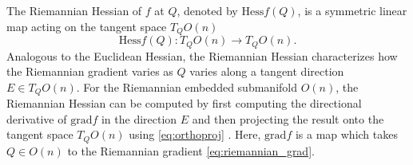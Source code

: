 \documentclass[pdflatex,sn-mathphys-num]{sn-jnl}
\begin{document}
The Riemannian Hessian of $f$ at $Q$, denoted by $\textrm{Hess}f(Q)$, is a symmetric linear map acting on the tangent space $T_QO(n)$ 
\begin{equation}
\textrm{Hess} f(Q): T_Q O(n) \rightarrow T_Q O(n). 
\end{equation}
Analogous to the Euclidean Hessian, the Riemannian Hessian characterizes how the Riemannian gradient varies as $Q$ varies along a tangent direction $E \in T_Q O(n)$. For the Riemannian embedded submanifold $O(n)$, the Riemannian Hessian can be computed by first computing the directional derivative of $\textrm{grad}f$ in the direction $E$ and then projecting the result onto the tangent space $T_Q O(n)$ using \eqref{eq:orthoproj} \cite{boumal2023introduction}. Here, $\textrm{grad}f$ is a map which takes $Q \in O(n)$ to the Riemannian gradient \eqref{eq:riemannian_grad}. 
\end{document}
